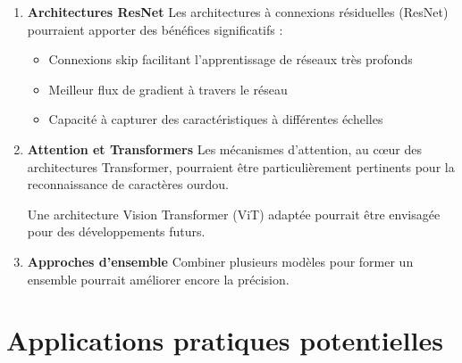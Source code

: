 \begin{flushleft}
\begin{enumerate}
\item \textbf{Architectures ResNet}
Les architectures à connexions résiduelles (ResNet) pourraient apporter des bénéfices significatifs :
\begin{itemize}
\item Connexions skip facilitant l'apprentissage de réseaux très profonds
\item Meilleur flux de gradient à travers le réseau
\item Capacité à capturer des caractéristiques à différentes échelles
\end{itemize}
\item \textbf{Attention et Transformers}
Les mécanismes d'attention, au cœur des architectures Transformer, pourraient être particulièrement pertinents pour la reconnaissance de caractères ourdou.

Une architecture Vision Transformer (ViT) adaptée pourrait être envisagée pour des développements futurs.

\item \textbf{Approches d'ensemble}
Combiner plusieurs modèles pour former un ensemble pourrait améliorer encore la précision.
\end{enumerate}
\end{flushleft}

\section{Applications pratiques potentielles}


